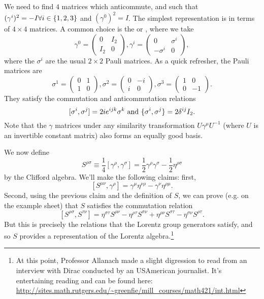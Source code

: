 We need to find $4$ matrices which anticommute, and such that $(\gamma^i)^2=-I \forall i\in \{1,2,3\}$ and $(\gamma^0)^2=I$. The simplest representation is in terms of $4\times 4$ matrices. A common choice is the  or , where we take
$$\gamma^0=\begin{pmatrix}
0&I_2\\
I_2 & 0
\end{pmatrix},
\gamma^i=\begin{pmatrix}
0&\sigma^i\\
-\sigma^i&0
\end{pmatrix},$$
where the $\sigma^i$ are the usual $2\times 2$ Pauli matrices. As a quick refresher, the Pauli matrices are
$$\sigma^1=\begin{pmatrix}
0&1\\1&0
\end{pmatrix},
\sigma^2=\begin{pmatrix}
0&-i\\i&0
\end{pmatrix},
\sigma^3=\begin{pmatrix}
1&0\\0&-1
\end{pmatrix}.$$
They satisfy the commutation and anticommutation relations
$$[\sigma^i,\sigma^j]=2i e^{ijk}\sigma^k\text{ and }\{\sigma^i,\sigma^j\}=2\delta^{ij}I_2.$$
Note that the $\gamma$ matrices under any similarity transformation $U\gamma^\mu U^{-1}$ (where $U$ is an invertible constant matrix) also forms an equally good basis.

We now define
$$S^{\rho\sigma}\equiv \frac{1}{4}[\gamma^\rho,\gamma^\sigma]=\frac{1}{2}\gamma^\rho \gamma^\sigma -\frac{1}{2} \eta^{\rho\sigma}$$
by the Clifford algebra. We'll make the following claims: first,
$$[S^{\mu\nu},\gamma^\rho]=\gamma^\mu \eta^{\nu\rho}-\gamma^\nu \eta^{\rho\mu}.$$
Second, using the previous claim and the definition of $S$, we can prove (e.g. on the example sheet) that $S$ satisfies the commutation relation
$$[S^{\rho\sigma},S^{\tau\nu}]=\eta^{\sigma\tau}S^{\rho\nu}-\eta^{\rho\tau}S^{\sigma\nu}+\eta^{\rho\nu}S^{\sigma\tau}-\eta^{\sigma\nu}S^{\rho\tau}.$$
But this is precisely the relations that the Lorentz group generators satisfy, and so $S$ provides a representation of the Lorentz algebra.\footnote{At this point, Professor Allanach made a slight digression to read from an interview with Dirac conducted by an USAmerican journalist. It's entertaining reading and can be found here: \url{http://sites.math.rutgers.edu/~greenfie/mill_courses/math421/int.html}}

